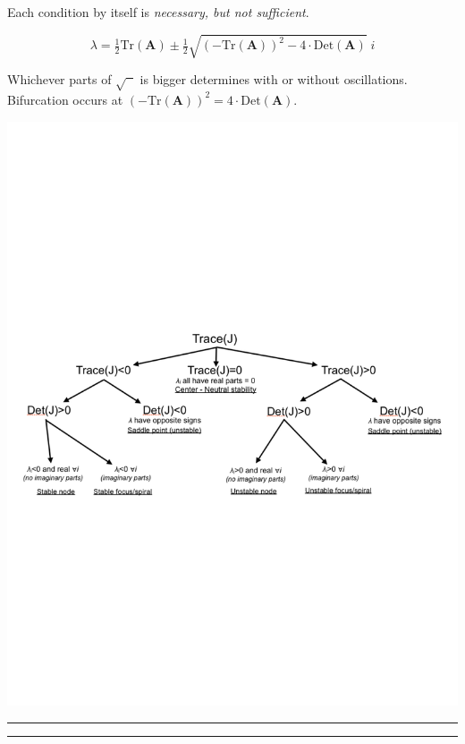 \documentclass{article}
\newcommand{\ind}{\-\hspace{1cm}}
\begin{document}
Each condition by itself is \emph{necessary, but not sufficient}.

\begin{equation*}
	\lambda = \tfrac{1}{2}\text{Tr}(\textbf{A}) \pm \tfrac{1}{2}\sqrt{(-\text{Tr}(\textbf{A}))^2 - 4\cdot\text{Det}(\textbf{A})} \; i
\end{equation*}

\ind Whichever parts of $\sqrt{\phantom{x}}$ is bigger determines with or without oscillations.\\
\ind Bifurcation occurs at $(-\text{Tr}(\textbf{A}))^2 = 4\cdot \text{Det}(\textbf{A})$.

\begin{center}
 	\includegraphics[width=16cm]{figs/Classify.pdf}
\end{center}
 
\rule[0.5ex]{\linewidth}{1pt}
\rule[0.5ex]{\linewidth}{1pt}
\end{document}
